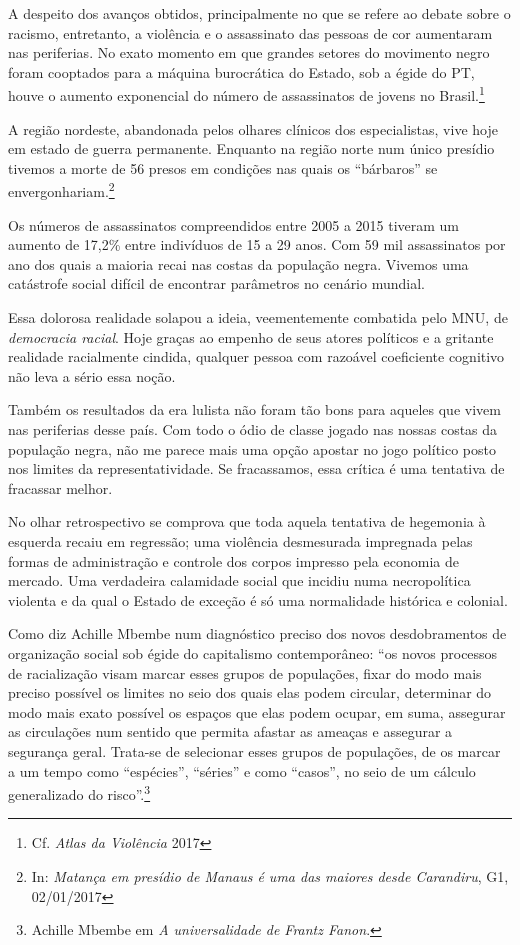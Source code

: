 A despeito dos avanços obtidos, principalmente no que se refere ao
debate sobre o racismo, entretanto, a violência e o assassinato das
pessoas de cor aumentaram nas periferias. No exato momento em que
grandes setores do movimento negro foram cooptados para a máquina
burocrática do Estado, sob a égide do PT, houve o aumento exponencial do
número de assassinatos de jovens no Brasil.\footnote{Cf. \emph{Atlas da
  Violência} 2017}

A região nordeste, abandonada pelos olhares clínicos dos especialistas,
vive hoje em estado de guerra permanente. Enquanto na região norte num
único presídio tivemos a morte de 56 presos em condições nas quais os
``bárbaros'' se envergonhariam.\footnote{In: \emph{Matança em presídio
  de Manaus é uma das maiores desde Carandiru}, G1, 02/01/2017}

Os números de assassinatos compreendidos entre 2005 a 2015 tiveram um
aumento de 17,2\% entre indivíduos de 15 a 29 anos. Com 59 mil
assassinatos por ano dos quais a maioria recai nas costas da população
negra. Vivemos uma catástrofe social difícil de encontrar parâmetros no
cenário mundial.

Essa dolorosa realidade solapou a ideia, veementemente combatida pelo
MNU, de \emph{democracia racial}. Hoje graças ao empenho de seus atores
políticos e a gritante realidade racialmente cindida, qualquer pessoa
com razoável coeficiente cognitivo não leva a sério essa noção.

Também os resultados da era lulista não foram tão bons para aqueles que
vivem nas periferias desse país. Com todo o ódio de classe jogado nas
nossas costas da população negra, não me parece mais uma opção apostar
no jogo político posto nos limites da representatividade. Se
fracassamos, essa crítica é uma tentativa de fracassar melhor.

No olhar retrospectivo se comprova que toda aquela tentativa de
hegemonia à esquerda recaiu em regressão; uma violência desmesurada
impregnada pelas formas de administração e controle dos corpos impresso
pela economia de mercado. Uma verdadeira calamidade social que incidiu
numa necropolítica violenta e da qual o Estado de exceção é só uma
normalidade histórica e colonial.

Como diz Achille Mbembe num diagnóstico preciso dos novos desdobramentos
de organização social sob égide do capitalismo contemporâneo: ``os novos
processos de racialização visam marcar esses grupos de populações, fixar
do modo mais preciso possível os limites no seio dos quais elas podem
circular, determinar do modo mais exato possível os espaços que elas
podem ocupar, em suma, assegurar as circulações num sentido que permita
afastar as ameaças e assegurar a segurança geral. Trata-se de selecionar
esses grupos de populações, de os marcar a um tempo como ``espécies'',
``séries'' e como ``casos'', no seio de um cálculo generalizado do
risco''.\footnote{Achille Mbembe em \emph{A universalidade de Frantz
  Fanon}.}

